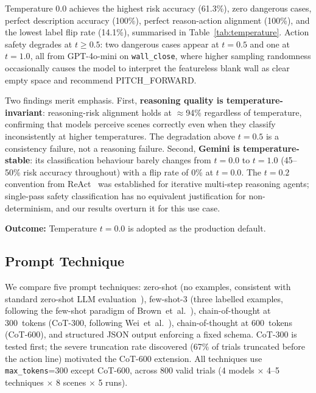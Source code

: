 \documentclass[journal]{IEEEtran}
\begin{document}
Temperature 0.0 achieves the highest risk accuracy (61.3\%), zero
dangerous cases, perfect description accuracy (100\%), perfect
reason-action alignment (100\%), and the lowest label flip rate (14.1\%),
summarised in Table~\ref{tab:temperature}.
Action safety degrades at $t \geq 0.5$: two dangerous cases appear at
$t=0.5$ and one at $t=1.0$, all from GPT-4o-mini on \texttt{wall\_close},
where higher sampling randomness occasionally causes the model to
interpret the featureless blank wall as clear empty space and recommend
PITCH\_FORWARD.

Two findings merit emphasis.
First, \textbf{reasoning quality is temperature-invariant}: reasoning-risk
alignment holds at $\approx$94\% regardless of temperature, confirming
that models perceive scenes correctly even when they classify
inconsistently at higher temperatures.
The degradation above $t=0.5$ is a consistency failure, not a reasoning
failure.
Second, \textbf{Gemini is temperature-stable}: its classification
behaviour barely changes from $t=0.0$ to $t=1.0$ (45--50\% risk accuracy
throughout) with a flip rate of 0\% at $t=0.0$.
The $t=0.2$ convention from ReAct~\cite{yao2022react} was established for
iterative multi-step reasoning agents; single-pass safety classification
has no equivalent justification for non-determinism, and our results
overturn it for this use case.

\textbf{Outcome:} Temperature $t=0.0$ is adopted as the production default.

\subsection{Prompt Technique}
\label{sec:v_prompt}

We compare five prompt techniques: zero-shot (no examples, consistent with
standard zero-shot LLM evaluation~\cite{brown2020gpt3}), few-shot-3
(three labelled examples, following the few-shot paradigm of
Brown~et~al.~\cite{brown2020gpt3}), chain-of-thought at 300~tokens
(CoT-300, following Wei~et~al.~\cite{wei2022cot}), chain-of-thought at
600~tokens (CoT-600), and structured JSON output enforcing a fixed schema.
CoT-300 is tested first; the severe truncation rate discovered (67\% of
trials truncated before the action line) motivated the CoT-600 extension.
All techniques use \texttt{max\_tokens}=300 except CoT-600, across 800
valid trials (4 models $\times$ 4--5 techniques $\times$ 8 scenes
$\times$ 5 runs).
\end{document}
